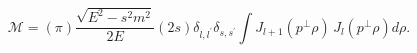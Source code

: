 \begin{equation}
\mathcal{M=}\left( \pi \right)
\frac{\sqrt{E^{2}-s^{2}m^{2}}
}{2E}
\left( 2s\right)
\delta _{l,l^{\prime }}\delta _{s,s^{\prime }}\int J_{l+1}\left( p^{\bot
}\rho \right) \,J_{l}\left( p^{\bot }\rho \right) d\rho  .
\end{equation}

